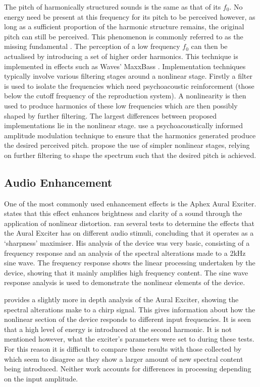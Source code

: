 		The pitch of harmonically structured sounds is the same as that of its $f_{0}$. No energy need be present
		at this frequency for its pitch to be perceived however, as long as a sufficient proportion of the harmonic
		structure remains, the original pitch can still be perceived. This phenomenon is commonly referred to as
		the missing fundamental \citep{plack2005the}. The perception of a low frequency $f_{0}$ can then be
		actualised by introducing a set of higher order harmonics. This technique is implemented in effects such as
		Waves' MaxxBass \citep{ben-tzur1999the}. Implementation techniques typically involve various filtering
		stages around a nonlinear stage. Firstly a filter is used to isolate the frequencies which need
		psychoacoustic reinforcement (those below the cutoff frequency of the reproduction system). A nonlinearity
		is then used to produce harmonics of these low frequencies which are then possibly shaped by further
		filtering. The largest differences between proposed implementations lie in the nonlinear stage.
		\citet{gan2001virtual} use a psychoacoustically informed amplitude modulation technique to ensure that the
		harmonics generated produce the desired perceived pitch. \citet{larsen2002reproducing} propose the use of
		simpler nonlinear stages, relying on further filtering to shape the spectrum such that the desired pitch is
		achieved.

	\subsection{Audio Enhancement}
	\label{sec:Excitation-Uses-Enhancement}
		One of the most commonly used enhancement effects is the Aphex Aural Exciter. \citet{shekar2013modeling}
		states that this effect enhances brightness and clarity of a sound through the application of nonlinear
		distortion. \citet{chalupper2000aural} ran several tests to determine the effects that the Aural Exciter
		has on different audio stimuli, concluding that it operates as a `sharpness' maximiser. His analysis of the
		device was very basic, consisting of a frequency response and an analysis of the spectral alterations made
		to a 2kHz sine wave. The frequency response shows the linear processing undertaken by the device, showing
		that it mainly amplifies high frequency content. The sine wave response analysis is used to demonstrate the
		nonlinear elements of the device. 

		\citet{dutilleux2011nonlinear} provides a slightly more in depth analysis of the Aural Exciter, showing the
		spectral alterations make to a chirp signal. This gives information about how the nonlinear section of the
		device responds to different input frequencies. It is seen that a high level of energy is introduced at the
		second harmonic. It is not mentioned however, what the exciter's parameters were set to during these tests.
		For this reason it is difficult to compare these results with those collected by \citet{chalupper2000aural}
		which seem to disagree as they show a larger amount of new spectral content being introduced. Neither work
		accounts for differences in processing depending on the input amplitude.

